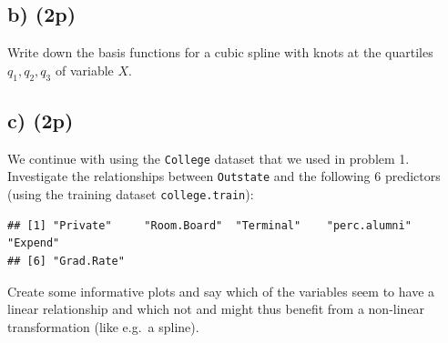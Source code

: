 \documentclass[]{article}
\newenvironment{Shaded}{\begin{snugshade}}{\end{snugshade}}
\newcommand{\DataTypeTok}[1]{\textcolor[rgb]{0.13,0.29,0.53}{#1}}
\newcommand{\DecValTok}[1]{\textcolor[rgb]{0.00,0.00,0.81}{#1}}
\newcommand{\KeywordTok}[1]{\textcolor[rgb]{0.13,0.29,0.53}{\textbf{#1}}}
\newcommand{\NormalTok}[1]{#1}
\newcommand{\OperatorTok}[1]{\textcolor[rgb]{0.81,0.36,0.00}{\textbf{#1}}}
\begin{document}
\hypertarget{b-2p-1}{%
\subsection{b) (2p)}\label{b-2p-1}}

Write down the basis functions for a cubic spline with knots at the
quartiles \(q_1, q_2, q_3\) of variable \(X\).

\hypertarget{c-2p}{%
\subsection{c) (2p)}\label{c-2p}}

We continue with using the \texttt{College} dataset that we used in
problem 1. Investigate the relationships between \texttt{Outstate} and
the following 6 predictors (using the training dataset
\texttt{college.train}):

\begin{verbatim}
## [1] "Private"     "Room.Board"  "Terminal"    "perc.alumni" "Expend"     
## [6] "Grad.Rate"
\end{verbatim}

Create some informative plots and say which of the variables seem to
have a linear relationship and which not and might thus benefit from a
non-linear transformation (like e.g.~a spline).

\begin{Shaded}
\end{Shaded}
\end{document}
